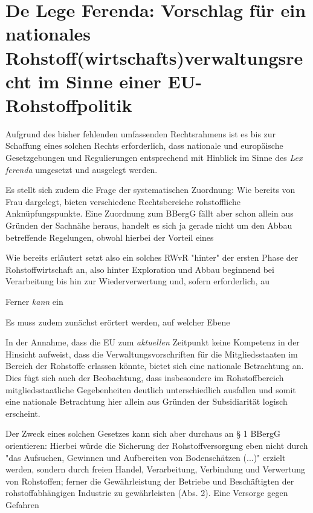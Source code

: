 \section{De Lege Ferenda: Vorschlag für ein nationales Rohstoff(wirtschafts)verwaltungsrecht im Sinne einer EU-Rohstoffpolitik}

Aufgrund des bisher fehlenden umfassenden Rechtsrahmens ist es bis zur Schaffung eines solchen Rechts erforderlich, dass nationale und europäische Gesetzgebungen und Regulierungen entsprechend mit Hinblick im Sinne des \textit{Lex ferenda} umgesetzt und ausgelegt werden. 

Es stellt sich zudem die Frage der systematischen Zuordnung: Wie bereits von Frau \autocite{frau2023} dargelegt, bieten verschiedene Rechtsbereiche rohstoffliche Anknüpfungspunkte. Eine Zuordnung zum BBergG fällt aber schon allein aus Gründen der Sachnähe heraus, handelt es sich ja gerade nicht um den Abbau betreffende Regelungen, obwohl hierbei der Vorteil eines

Wie bereits erläutert setzt also ein solches RWvR "hinter" der ersten Phase der Rohstoffwirtschaft an, also hinter Exploration und Abbau beginnend bei Verarbeitung bis hin zur Wiederverwertung und, sofern erforderlich, au

Ferner \textit{kann} ein 

Es muss zudem zunächst erörtert werden, auf welcher Ebene

In der Annahme, dass die EU zum \textit{aktuellen} Zeitpunkt keine Kompetenz in der Hinsicht aufweist, dass die Verwaltungsvorschriften für die Mitgliedsstaaten im Bereich der Rohstoffe erlassen könnte, bietet sich eine nationale Betrachtung an. Dies fügt sich auch der Beobachtung, dass insbesondere im Rohstoffbereich mitgliedsstaatliche Gegebenheiten deutlich unterschiedlich ausfallen und somit eine nationale Betrachtung hier allein aus Gründen der Subsidiarität logisch erscheint.


Der Zweck eines solchen Gesetzes kann sich aber durchaus an § 1 BBergG orientieren: Hierbei würde die Sicherung der Rohstoffversorgung eben nicht durch "das Aufsuchen, Gewinnen und Aufbereiten von Bodenschätzen (...)" erzielt werden, sondern durch freien Handel, Verarbeitung, Verbindung und Verwertung von Rohstoffen; ferner die Gewährleistung der Betriebe und Beschäftigten der rohstoffabhängigen Industrie zu gewährleisten (Abs. 2). Eine Versorge gegen Gefahren

